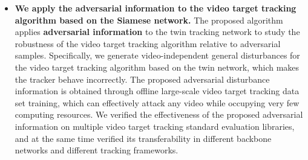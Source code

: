 \begin{itemize}
\item{\textbf{We apply the adversarial information to the video target tracking algorithm based on the Siamese network.} The proposed algorithm applies \textbf{adversarial information} to the twin tracking network to study the robustness of the video target tracking algorithm relative to adversarial samples. Specifically, we generate video-independent general disturbances for the video target tracking algorithm based on the twin network, which makes the tracker behave incorrectly. The proposed adversarial disturbance information is obtained through offline large-scale video target tracking data set training, which can effectively attack any video while occupying very few computing resources. We verified the effectiveness of the proposed adversarial information on multiple video target tracking standard evaluation libraries, and at the same time verified its transferability in different backbone networks and different tracking frameworks.}
\end{itemize}

